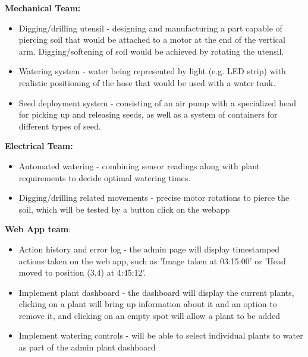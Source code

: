 \documentclass{article}
\begin{document}
\textbf{Mechanical Team:}
\begin{itemize}
    \vspace{-3mm}
    \setlength\itemsep{-0.6em}
    \item Digging/drilling utensil - designing and manufacturing a part capable of piercing soil that would be attached to a motor at the end of the vertical arm. Digging/softening of soil would be achieved by rotating the utensil.
    \item Watering system - water being represented by light (e.g. LED strip) with realistic positioning of the hose that would be used with a water tank.
    \item Seed deployment system - consisting of an air pump with a specialized head for picking up and releasing seeds, as well as a system of containers for different types of seed.
    \vspace{-3mm}
\end{itemize}
\textbf{Electrical Team:}
\vspace{-1mm}
\begin{itemize}
    \vspace{-3mm}
    \setlength\itemsep{-0.4em}
    \item Automated watering - combining sensor readings along with plant requirements to decide optimal watering times.
    \item Digging/drilling related movements - precise motor rotations to pierce the soil, which will be tested by a button click on the webapp 
    \vspace{-3mm}
\end{itemize}

\textbf{Web App team}:
\vspace{-1mm}
\begin{itemize}
    \vspace{-3mm}
    \setlength{\itemsep}{0pt}
    \setlength{\parskip}{0pt}
    \setlength{\topsep}{0pt}
    \item Action history and error log - the admin page will display timestamped actions taken on the web app, such as 'Image taken at 03:15:00' or 'Head moved to position (3,4) at 4:45:12'.
    \item Implement plant dashboard - the dashboard will display the current plants, clicking on a plant will bring up information about it and an option to remove it, and clicking on an empty spot will allow a plant to be added
    \item Implement watering controls - will be able to select individual plants to water as part of the admin plant dashboard
\end{itemize}
\end{document}
